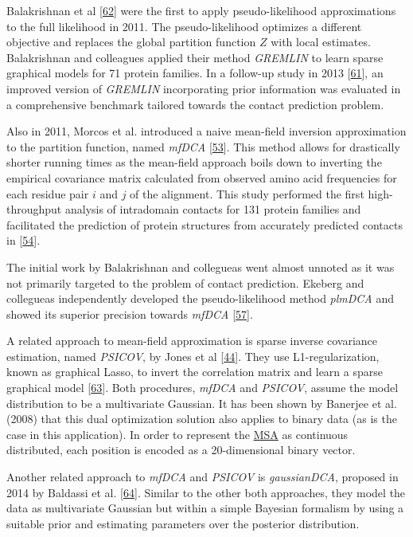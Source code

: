 \documentclass[12pt,a4paper,twoside]{book}
\theoremstyle{definition}
\theoremstyle{definition}
\theoremstyle{remark}
\begin{document}
Balakrishnan et al {[}\protect\hyperlink{ref-Balakrishnan2011}{62}{]}
were the first to apply pseudo-likelihood approximations to the full
likelihood in 2011. The pseudo-likelihood optimizes a different
objective and replaces the global partition function \(Z\) with local
estimates. Balakrishnan and colleagues applied their method
\emph{GREMLIN} to learn sparse graphical models for 71 protein families.
In a follow-up study in 2013
{[}\protect\hyperlink{ref-Kamisetty2013}{61}{]}, an improved version of
\emph{GREMLIN} incorporating prior information was evaluated in a
comprehensive benchmark tailored towards the contact prediction problem.

Also in 2011, Morcos et al. introduced a naive mean-field inversion
approximation to the partition function, named \emph{mfDCA}
{[}\protect\hyperlink{ref-Morcos2011}{53}{]}. This method allows for
drastically shorter running times as the mean-field approach boils down
to inverting the empirical covariance matrix calculated from observed
amino acid frequencies for each residue pair \(i\) and \(j\) of the
alignment. This study performed the first high-throughput analysis of
intradomain contacts for 131 protein families and facilitated the
prediction of protein structures from accurately predicted contacts in
{[}\protect\hyperlink{ref-Marks2011}{54}{]}.

The initial work by Balakrishnan and collegueas went almost unnoted as
it was not primarily targeted to the problem of contact prediction.
Ekeberg and collegueas independently developed the pseudo-likelihood
method \emph{plmDCA} and showed its superior precision towards
\emph{mfDCA} {[}\protect\hyperlink{ref-Ekeberg2013}{57}{]}.

A related approach to mean-field approximation is sparse inverse
covariance estimation, named \emph{PSICOV}, by Jones et al
{[}\protect\hyperlink{ref-Jones2012}{44}{]}. They use L1-regularization,
known as graphical Lasso, to invert the correlation matrix and learn a
sparse graphical model {[}\protect\hyperlink{ref-Friedman2008}{63}{]}.
Both procedures, \emph{mfDCA} and \emph{PSICOV}, assume the model
distribution to be a multivariate Gaussian. It has been shown by
Banerjee et al. (2008) that this dual optimization solution also applies
to binary data (as is the case in this application). In order to
represent the \protect\hyperlink{abbrev}{MSA} as continuous distributed,
each position is encoded as a 20-dimensional binary vector.

Another related approach to \emph{mfDCA} and \emph{PSICOV} is
\emph{gaussianDCA}, proposed in 2014 by Baldassi et al.
{[}\protect\hyperlink{ref-Baldassi2014}{64}{]}. Similar to the other
both approaches, they model the data as multivariate Gaussian but within
a simple Bayesian formalism by using a suitable prior and estimating
parameters over the posterior distribution.
\end{document}
